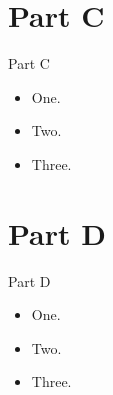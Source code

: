 \documentclass{beamer}
\begin{document}
\section{Part C}
    \begin{frame}{Part C}
        \begin{itemize}
            \item One.
            \item Two.
            \item Three.
        \end{itemize}
    \end{frame}

\section{Part D}
    \begin{frame}{Part D}
        \begin{itemize}
            \item One.
            \item Two.
            \item Three.
        \end{itemize}
    \end{frame}
\end{document}
